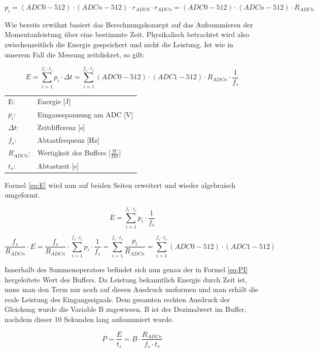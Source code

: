 \begin{equation}
p_i=(ADC0-512)\cdot(ADCn -512) \cdot r_{ADC0} \cdot r_{ADCn} = (ADC0-512)\cdot(ADCn -512) \cdot R_{ADCn}
\label{eq:PI}
\end{equation}

Wie bereits erwähnt basiert das Berechnungskonzept auf das Aufsummieren der Momentanleistung über eine bestimmte Zeit. Physikalisch betrachtet wird also zwischenzeitlich die Energie gespeichert und nicht die Leistung. Ist wie in unserem Fall die Messung zeitdiskret, so gilt:

\begin{equation}
E=\sum_{i=1}^{f_s \cdot t_s} p_i \cdot\Delta t = \sum_{i=1}^{f_s \cdot t_s} (ADC0-512)\cdot(ADC1 -512) \cdot R_{ADCn} \cdot \frac{1}{f_s}
\label{eq:E}
\end{equation}

\begin{table}[H]
\begin{tabular}{ll}
E:			&  Energie [J]\\
$p_i$:		&  Eingansspannung am ADC [V]\\
$\Delta t$:	&  Zeitdifferenz [s]\\
$f_s$:		&  Abtastfrequenz [Hz]\\
$ R_{ADCn} $: & Wertigkeit des Buffers [$\frac{W}{Bit}$]\\
$t_s$:		&  Abtastzeit [s]
\end{tabular}
\end{table}

Formel \ref{eq:E} wird nun auf beiden Seiten erweitert und wieder algebraisch umgeformt.

$$E=\sum_{i=1}^{f_s \cdot t_s} p_i \cdot \frac{1}{f_s}$$

$$\frac{f_s}{R_{ADCn}}\cdot E =\frac{f_s}{R_{ADCn}}\cdot \sum_{i=1}^{f_s \cdot t_s} p_i \cdot \frac{1}{f_s} = \sum_{i=1}^{f_s \cdot t_s} \frac{p_i}{R_{ADCn}} = \sum_{i=1}^{f_s \cdot t_s} (ADC0-512)\cdot(ADC1 -512)$$

Innerhalb des Summenoperators befindet sich nun genau der in Formel \ref{eq:PI} hergeleitete Wert des Buffers. Da Leistung bekanntlich Energie durch Zeit ist, muss man den Term nur noch auf diesen Ausdruck umformen und man erhält die reale Leistung des Eingangssignals. Dem gesamten rechten Ausdruck der Gleichung wurde die Variable B zugewiesen. B ist der Dezimalwert im Buffer, nachdem dieser 10 Sekunden lang aufsummiert wurde.

\begin{equation}
\overline{P} = \frac{E}{t_s} = B \cdot \frac{R_{ADCn}}{f_s \cdot t_s}
\label{eq:P}
\end{equation}

